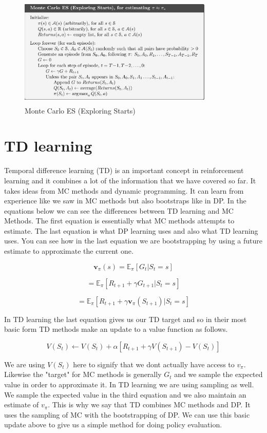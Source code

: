 \begin{figure}[h!]
        \centering
        \includegraphics[width=350px,height=200px]{images/mc_es.png}
        \caption{Monte Carlo ES (Exploring Starts)}
        \label{fig:my_label}
    \end{figure}


\section{TD learning}

Temporal difference learning (TD) is an important concept in reinforcement learning and it combines a lot of the information that we have covered so far. It takes ideas from MC methods and dynamic programming. It can learn from experience like we saw in MC methods but also bootstraps like in DP. In the equations below we can see the differences between TD learning and MC Methods. The first equation is essentially what MC methods attempts to estimate. The last equation is what DP learning uses and also what TD learning uses. You can see how in the last equation we are bootstrapping by using a future estimate to approximate the current one. 

$$ \mathbf{v}_{\pi}(s) = \mathbb{E}_{\pi}[G_{t} | S_{t} = s] $$

$$ =  \mathbb{E}_{\pi}[R_{t + 1} + \gamma G_{t + 1} | S_{t} = s] $$

$$ =  \mathbb{E}_{\pi}[R_{t + 1} + \gamma \mathbf{v}_{\pi}(S_{t + 1}) | S_{t} = s] $$

In TD learning the last equation gives us our TD target and so in their most basic form TD methods make an update to a value function as follows. 

$$ V(S_{t}) \leftarrow V(S_{t}) + \alpha[R_{t + 1} + \gamma V(S_{t + 1}) - V(S_{t})] $$

We are using $V(S_{t})$ here to signify that we dont actually have access to $v_{\pi}$. Likewise the "target" for MC methods is generally $G_{t}$ and we sample the expected value in order to approximate it. In TD learning we are using sampling as well. We sample the expected value in the third equation and we also maintain an estimate of $v_{\pi}$. This is why we say that TD combines MC methods and DP. It uses the sampling of MC with the bootstrapping of DP. We can use this basic update above to give us a simple method for doing policy evaluation. 

